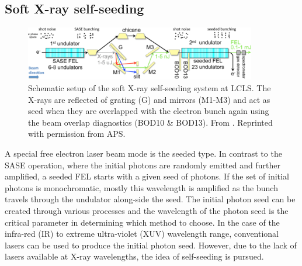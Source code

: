 \subsection{Soft X-ray self-seeding}\label{sec:sxrss}
%
\begin{figure}
	\centering
		\includegraphics[width=0.90\textwidth]{images/seeded.png}
	\caption[Schematic setup of soft X-ray self-seeding system.]{Schematic setup of the soft X-ray self-seeding system at LCLS. The X-rays are reflected of grating (G) and mirrors (M1-M3) and act as seed when they are overlapped with the electron bunch again using the beam overlap diagnostics (BOD10 \& BOD13). From \citep{Ratner-2015-PRL}. Reprinted with permission from APS.}
	\label{fig:seeded-setup}
\end{figure}
%
A special free electron laser beam mode is the seeded type. In contrast to the SASE operation, where the initial photons are randomly emitted and further amplified, a seeded FEL starts with a given seed of photons. If the set of initial photons is monochromatic, mostly this wavelength is amplified as the bunch travels through the undulator along-side the seed. The initial photon seed can be created through various processes and the wavelength of the photon seed is the critical parameter in determining which method to choose. In the case of the infra-red (IR) to extreme ultra-violet (XUV) wavelength range, conventional lasers can be used to produce the initial photon seed. However, due to the lack of lasers available at X-ray wavelengths, the idea of self-seeding is pursued.\\[1\baselineskip]
%

